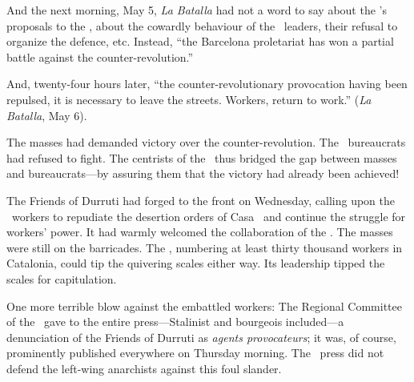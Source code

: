 And the next morning, May 5, \emph{La Batalla} had not a word to say about the \POUM’s proposals to the \CNT, about the cowardly behaviour of the \CNT\ leaders, their refusal to organize the defence, etc. Instead, ``the Barcelona proletariat has won a partial battle against the counter-revolution.''

And, twenty-four hours later, ``the counter-revolutionary provocation having been repulsed, it is necessary to leave the streets. Workers, return to work.'' (\emph{La Batalla}, May 6).

The masses had demanded victory over the counter-revolution. The \CNT\ bureaucrats had refused to fight. The centrists of the \POUM\ thus bridged the gap between masses and bureaucrats---by assuring them that the victory had already been achieved!

The Friends of Durruti had forged to the front on Wednesday, calling upon the \CNT\ workers to repudiate the desertion orders of Casa \CNT\ and continue the struggle for workers’ power. It had warmly welcomed the collaboration of the \POUM. The masses were still on the barricades. The \POUM, numbering at least thirty thousand workers in Catalonia, could tip the quivering scales either way. Its leadership tipped the scales for capitulation.

One more terrible blow against the embattled workers: The Regional Committee of the \CNT\ gave to the entire press---Stalinist and bourgeois included---a denunciation of the Friends of Durruti as \emph{agents provocateurs}; it was, of course, prominently published everywhere on Thursday morning. The \POUM\ press did not defend the left-wing anarchists against this foul slander.

